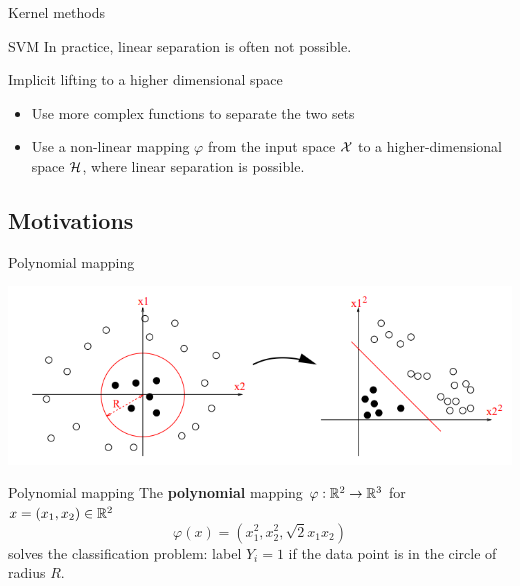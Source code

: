 \documentclass[xcolor={usenames,dvipsnames}]{beamer}
\begin{document}
\begin{frame}{Kernel methods}
\begin{block}{SVM}
 In practice, linear separation is often not possible.
\end{block}

\vspace{.2cm}

\begin{exampleblock}{Implicit lifting to a higher dimensional space}
\begin{itemize}
\item Use more complex functions to separate the two sets
\item Use a non-linear mapping $\varphi$ from the input space ${\mathcal{X}}$ \alert{to a higher-dimensional space $\mathcal{H}$, where linear separation is possible}.
\end{itemize}
\end{exampleblock}
\end{frame}
 
 \subsection{Motivations}
 
 \begin{frame}{Polynomial mapping}
 \begin{centering}
\includegraphics[scale=0.6]{polynomial_kernel.png}
\end{centering}
 \begin{block}{Polynomial mapping}
 The \textbf{polynomial} mapping $\varphi : \mathbb{R}^2 \rightarrow \mathbb{R}^3$ 
  for $x = (x_1, x_2) \in \mathbb{R}^2$
  \begin{equation*}
    \varphi(x) = (x_1^2, x_2^2, \sqrt{2} x_1 x_2)
  \end{equation*}
  solves the classification problem: \alert{label $Y_i=1$ if the data point is in the circle of radius $R$}.
  \end{block}
 
 
  \end{frame}
  
\end{document}

